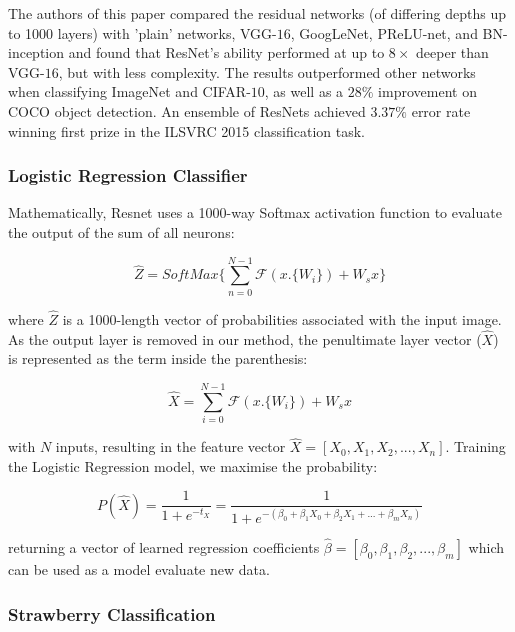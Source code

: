 \documentclass[fleqn,twoside]{article}
\begin{document}
The authors of this paper \cite{he} compared the residual networks (of differing depths up to 1000 layers) with 'plain' networks, VGG-$16$, GoogLeNet, PReLU-net, and BN-inception and found that ResNet's ability performed at up to $8\times$ deeper than VGG-$16$, but with less complexity. The results outperformed other networks when classifying ImageNet and CIFAR-$10$, as well as a $28\%$ improvement on COCO object detection. An ensemble of ResNets achieved $3.37\%$ error rate winning first prize in the ILSVRC 2015 classification task.


\subsubsection{Logistic Regression Classifier}


Mathematically, Resnet uses a 1000-way Softmax activation function to evaluate the output of the sum of all neurons:

\begin{equation}
\hat{Z} = SoftMax\Bigg \{ \sum_{n=0}^{N-1} \mathcal{F}(x.\{W_i\}) + W_s x \Bigg \}
\end{equation}

where $\hat{Z}$ is a 1000-length vector of probabilities associated with the input image. As the output layer is removed in our method, the penultimate layer vector ($\hat{X}$) is represented as the term inside the parenthesis:

\begin{equation}
\hat{X} = \sum_{i=0}^{N-1} \mathcal{F}(x.\{W_i\}) + W_s x
\end{equation}

with $N$ inputs, resulting in the feature vector $\hat{X}=[X_0, X_1, X_2,..., X_n]$. Training the Logistic Regression model, we maximise the probability:

\begin{equation}
P(\hat{X}) = \frac{1}{1+e^{-t_X}} 
= \frac{1}{1+e^{-(\beta_0+\beta_1 X_0 + \beta_2         X_1+...+\beta_m X_n)}}
\end{equation}

returning a vector of learned regression coefficients $\hat{\beta}=[\beta_0, \beta_1, \beta_2,...,\beta_m]$ which can be used as a model evaluate new data. 



\subsubsection{Strawberry Classification}
\label{sec:strawberry_classification}
\end{document}
